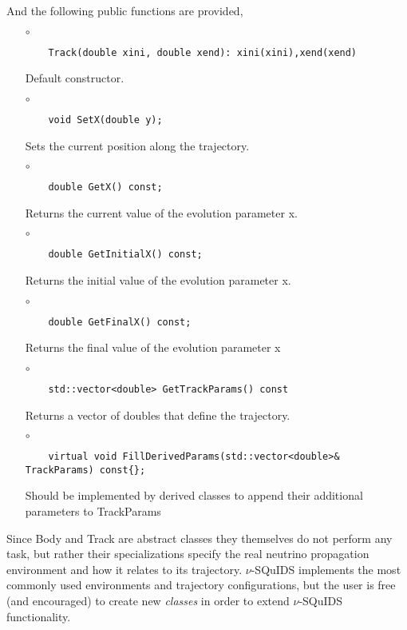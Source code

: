 And the following public functions are provided,
%
\begin{itemize}
\item[$\circ$]  
  \begin{lstlisting}
    Track(double xini, double xend): xini(xini),xend(xend)
  \end{lstlisting}
  Default constructor.
\item[$\circ$]  
  \begin{lstlisting}
    void SetX(double y);
  \end{lstlisting}
  Sets the current position along the trajectory.
  
\item[$\circ$]  
  \begin{lstlisting}
    double GetX() const;
  \end{lstlisting}
  Returns the current value of the evolution parameter {\ttf x}.
\item[$\circ$]  
  \begin{lstlisting}
    double GetInitialX() const;
  \end{lstlisting}    
  Returns the initial value of the evolution parameter {\ttf x}.
\item[$\circ$]  
  \begin{lstlisting}
    double GetFinalX() const;
  \end{lstlisting}          
  Returns the final value of the evolution parameter {\ttf x}
\item[$\circ$]  
  \begin{lstlisting}
    std::vector<double> GetTrackParams() const 
  \end{lstlisting}           
  Returns a vector of doubles that define the trajectory.
\item[$\circ$]  
  \begin{lstlisting}
    virtual void FillDerivedParams(std::vector<double>& TrackParams) const{};
  \end{lstlisting}           
  Should be implemented by derived classes to append their
  additional parameters to TrackParams
\end{itemize}


Since {\ttf Body} and {\ttf Track} are abstract classes they themselves do not perform any task, but rather their specializations specify the real neutrino propagation environment and how it relates to its trajectory. $\nu$-SQuIDS implements the most commonly used environments and trajectory configurations, but the user is free (and encouraged) to create new {\it classes} in order to extend $\nu$-SQuIDS functionality.

